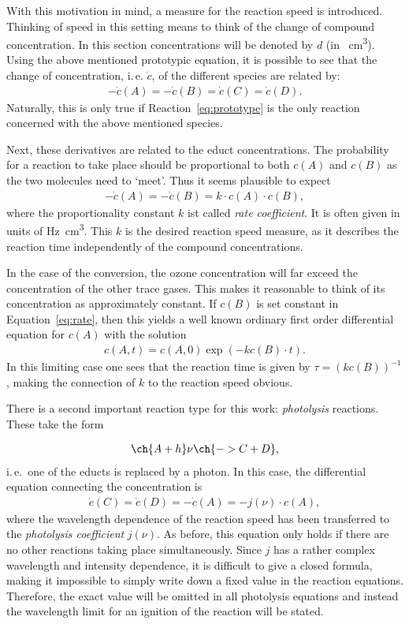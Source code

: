 With this motivation in mind, a measure for the reaction speed is
introduced. Thinking of speed in this setting means to think of the
change of compound concentration. In this section concentrations will
be denoted by $d$ (in \si{\per\cubic\centi\meter}). Using the above
mentioned prototypic equation, it is possible to see that the change
of concentration, i.\,e. $\dot c$, of the different species are
related by:
\begin{align*}
  -\dot c(A) = - \dot c(B) = \dot c(C) = \dot c(D).
\end{align*}
Naturally, this is only true if Reaction~\eqref{eq:prototype} is the
only reaction concerned with the above mentioned species.

Next, these derivatives are related to the educt concentrations. The
probability for a reaction to take place should be proportional to
both $c(A)$ and $c(B)$ as the two molecules need to `meet'. Thus it
seems plausible to expect
\begin{align}
  -\dot c(A) = - \dot c(B) = k \cdot c(A) \cdot c(B), \label{eq:rate}
\end{align}
where the proportionality constant $k$ ist called \emph{rate
  coefficient}. It is often given in units of
\si{\hertz\cubic\centi\meter}. This $k$ is the desired reaction
speed measure, as it describes the
reaction time independently of the compound concentrations.

In the case of the conversion, the ozone concentration will far exceed
the concentration of the other trace gases. This makes it reasonable
to think of its concentration as approximately constant. If $c(B)$ is
set constant in Equation~\eqref{eq:rate}, then this yields a well
known ordinary first order differential equation for $c(A)$ with the
solution
\begin{align*}
  c(A,t) = c(A,0)\exp(-kc(B)\cdot t).
\end{align*}
In this limiting case one sees that the reaction time is given by $\tau =
(kc(B))^{-1}$, making the connection of $k$ to the reaction speed
obvious.

There is a second important reaction type for this work:
\emph{photolysis} reactions. These take the form

\begin{align}
  \ch{A + h}\nu \ch{-> C + D},
\end{align}
i.\,e.\ one of the educts is replaced by a photon. In this case, the
differential equation connecting the concentration is
\begin{align}
  \dot c(C) = \dot c(D) = -\dot c(A) = - j(\nu) \cdot c(A),
\end{align}
where the wavelength dependence of the reaction speed has been
transferred to the \emph{photolysis coefficient} $j(\nu)$. As before,
this equation only holds if there are no other reactions taking place
simultaneously. Since $j$ has a rather complex wavelength and
intensity dependence, it is difficult to give a closed formula, making
it impossible to simply write down a fixed value in the reaction
equations. Therefore, the exact value will be omitted in all photolysis
equations and instead the wavelength limit for an ignition of the
reaction will be stated.


